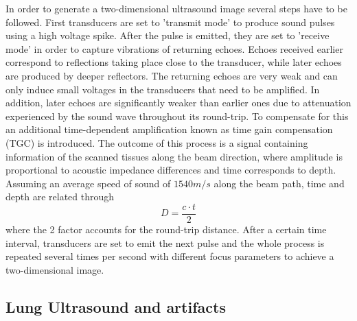 \documentclass[12pt]{article} %
\begin{document}
	In order to generate a two-dimensional ultrasound image several steps have to be followed. First transducers are set to 'transmit mode' to produce sound pulses using a high voltage spike. After the pulse is emitted, they are set to 'receive mode' in order to capture vibrations of returning echoes. Echoes received earlier correspond to reflections taking place close to the transducer, while later echoes are produced by deeper reflectors.  The returning echoes are very weak and can only induce small voltages in the transducers that need to be amplified. In addition, later echoes are significantly weaker than earlier ones due to attenuation experienced by the sound wave throughout its round-trip. To compensate for this an additional time-dependent amplification known as time gain compensation (TGC) is introduced. The outcome of this process is a signal containing information of the scanned tissues along the beam direction, where amplitude is proportional to acoustic impedance differences and time corresponds to depth. Assuming an average speed of sound of $1540 m/s$ along the beam path, time and depth are related through \[ D = \frac{c·t}{2} \] where the 2 factor accounts for the round-trip distance. After a certain time interval, transducers are set to emit the next pulse and the whole process is repeated several times per second with different focus parameters to achieve a two-dimensional image. 

\subsection{Lung Ultrasound and artifacts}

\end{document}
